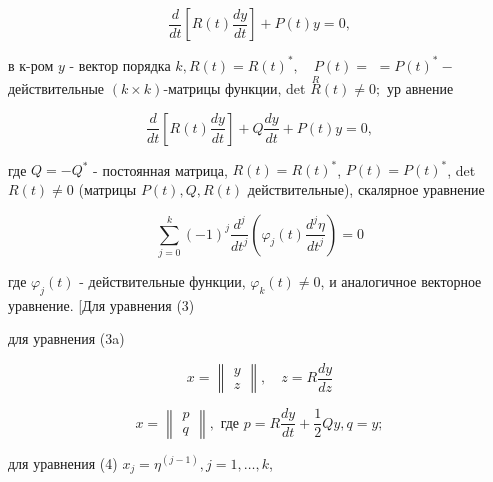 \documentclass[10pt]{article}
\begin{document}
\[

\frac{d}{d t}\left[R(t) \frac{d y}{d t}\right]+P(t) y=0,

\]



в к-ром $y$ - вектор порядка $k, R(t)=R(t)^{*}, \quad P(t)=$ $=P(t)^{*}-$ действительные $(k \times k)$-матрицы функции, det $\stackrel{R}{R}(t) \neq 0 ;$ ур авнение



\[

\frac{d}{d t}\left[R(t) \frac{d y}{d t}\right]+Q \frac{d y}{d t}+P(t) y=0,

\]



где $Q=-Q^{*}$ - постоянная матрица, $R(t)=R(t)^{*}$, $P(t)=P(t)^{*}$, det $R(t) \neq 0$ (матрицы $P(t), Q, R(t)$ действительные), скалярное уравнение



\[

\sum_{j=0}^{k}(-1)^{j} \frac{d^{j}}{d t^{j}}\left(\varphi_{j}(t) \frac{d^{j} \eta}{d t^{j}}\right)=0

\]



где $\varphi_{j}(t)$ - действительные функции, $\varphi_{k}(t) \neq 0$, и аналогичное векторное уравнение. [Для уравнения (3)



для уравнения (3a)



\[

x=\left\|\begin{array}{l}

y \\

z

\end{array}\right\|, \quad z=R \frac{d y}{d z}

\]



\[

x=\left\|\begin{array}{c}

p \\

q

\end{array}\right\|, \text { где } p=R \frac{d y}{d t}+\frac{1}{2} Q y, q=y ;

\]



для уравнения (4) $x_{j}=\eta^{(j-1)}, j=1, \ldots, k$,
\end{document}
